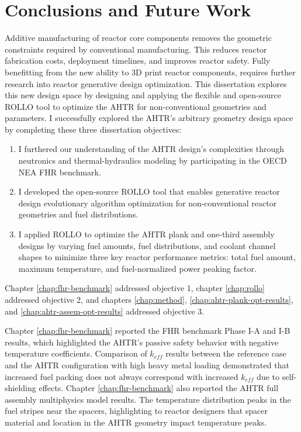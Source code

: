 \chapter{Conclusions and Future Work}
\glsresetall
\label{chap:concl}

Additive manufacturing of reactor core components removes the geometric constraints
required by conventional manufacturing. 
This reduces reactor fabrication costs, deployment timelines, and improves reactor 
safety. 
Fully benefitting from the new ability to 3D print reactor components, requires further 
research into reactor generative design optimization. 
This dissertation explores this new design space by designing and applying the flexible 
and open-source \gls{ROLLO} tool to optimize the \gls{AHTR} for non-conventional 
geometries and parameters. 
I successfully explored the \gls{AHTR}'s arbitrary geometry design space by completing 
these three dissertation objectives: 
\begin{enumerate}
    \item I furthered our understanding of the \gls{AHTR} design's complexities 
    through neutronics and thermal-hydraulics modeling by participating in the 
    \gls{OECD} \gls{NEA} \gls{FHR} benchmark.
    \item I developed the open-source \gls{ROLLO} tool that enables generative reactor 
    design evolutionary algorithm optimization for non-conventional reactor geometries 
    and fuel distributions.
    \item I applied \gls{ROLLO} to optimize the \gls{AHTR} plank and one-third assembly
    designs by varying fuel amounts, fuel distributions, and coolant channel shapes to 
    minimize three key reactor performance metrics: total fuel amount, maximum 
    temperature, and fuel-normalized power peaking factor.
\end{enumerate}
Chapter \ref{chap:fhr-benchmark} addressed objective 1, chapter \ref{chap:rollo} 
addressed objective 2, and chapters \ref{chap:method}, \ref{chap:ahtr-plank-opt-results}, 
and \ref{chap:ahtr-assem-opt-results} addressed objective 3. 

Chapter \ref{chap:fhr-benchmark} reported the \gls{FHR} benchmark Phase I-A and I-B 
results, which highlighted the \gls{AHTR}'s passive safety behavior with 
negative temperature coefficients. 
Comparison of $k_{eff}$ results between the reference case and the \gls{AHTR} 
configuration with high heavy metal loading demonstrated that increased fuel 
packing does not always correspond with increased $k_{eff}$ due to self-shielding 
effects.
Chapter \ref{chap:fhr-benchmark} also reported the \gls{AHTR} full assembly 
multiphysics model results. The temperature distribution peaks in the fuel stripes near 
the spacers, highlighting to reactor designers that spacer material and location in the 
\gls{AHTR} geometry impact temperature peaks.  

